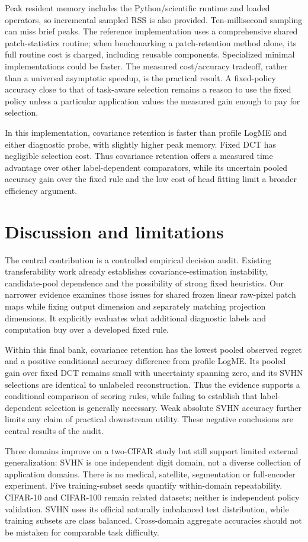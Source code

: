 \documentclass[11pt]{article}
\begin{document}
Peak resident memory includes the Python/scientific runtime and loaded operators, so incremental sampled RSS is also provided. Ten-millisecond sampling can miss brief peaks. The reference implementation uses a comprehensive shared patch-statistics routine; when benchmarking a patch-retention method alone, its full routine cost is charged, including reusable components. Specialized minimal implementations could be faster. The measured cost/accuracy tradeoff, rather than a universal asymptotic speedup, is the practical result. A fixed-policy accuracy close to that of task-aware selection remains a reason to use the fixed policy unless a particular application values the measured gain enough to pay for selection.

In this implementation, covariance retention is faster than profile LogME and either diagnostic probe, with slightly higher peak memory. Fixed DCT has negligible selection cost. Thus covariance retention offers a measured time advantage over other label-dependent comparators, while its uncertain pooled accuracy gain over the fixed rule and the low cost of head fitting limit a broader efficiency argument.

\section{Discussion and limitations}
The central contribution is a controlled empirical decision audit. Existing transferability work already establishes covariance-estimation instability, candidate-pool dependence and the possibility of strong fixed heuristics. Our narrower evidence examines those issues for shared frozen linear raw-pixel patch maps while fixing output dimension and separately matching projection dimensions. It explicitly evaluates what additional diagnostic labels and computation buy over a developed fixed rule.

Within this final bank, covariance retention has the lowest pooled observed regret and a positive conditional accuracy difference from profile LogME. Its pooled gain over fixed DCT remains small with uncertainty spanning zero, and its SVHN selections are identical to unlabeled reconstruction. Thus the evidence supports a conditional comparison of scoring rules, while failing to establish that label-dependent selection is generally necessary. Weak absolute SVHN accuracy further limits any claim of practical downstream utility. These negative conclusions are central results of the audit.

Three domains improve on a two-CIFAR study but still support limited external generalization: SVHN is one independent digit domain, not a diverse collection of application domains. There is no medical, satellite, segmentation or full-encoder experiment. Five training-subset seeds quantify within-domain repeatability. CIFAR-10 and CIFAR-100 remain related datasets; neither is independent policy validation. SVHN uses its official naturally imbalanced test distribution, while training subsets are class balanced. Cross-domain aggregate accuracies should not be mistaken for comparable task difficulty.
\end{document}

